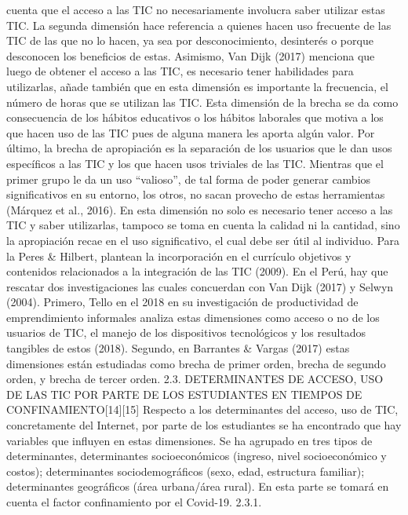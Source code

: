 \begin{enumerate}
  cuenta que el acceso a las TIC no necesariamente involucra saber
  utilizar estas TIC. La segunda dimensión hace referencia a quienes
  hacen uso frecuente de las TIC de las que no lo hacen, ya sea por
  desconocimiento, desinterés o porque desconocen los beneficios de
  estas. Asimismo, Van Dijk (2017) menciona que luego de obtener el
  acceso a las TIC, es necesario tener habilidades para utilizarlas,
  añade también que en esta dimensión es importante la frecuencia, el
  número de horas que se utilizan las TIC. Esta dimensión de la brecha
  se da como consecuencia de los hábitos educativos o los hábitos
  laborales que motiva a los que hacen uso de las TIC pues de alguna
  manera les aporta algún valor. Por último, la brecha de apropiación es
  la separación de los usuarios que le dan usos específicos a las TIC y
  los que hacen usos triviales de las TIC. Mientras que el primer grupo
  le da un uso ``valioso'', de tal forma de poder generar cambios
  significativos en su entorno, los otros, no sacan provecho de estas
  herramientas (Márquez et al., 2016). En esta dimensión no solo es
  necesario tener acceso a las TIC y saber utilizarlas, tampoco se toma
  en cuenta la calidad ni la cantidad, sino la apropiación recae en el
  uso significativo, el cual debe ser útil al individuo. Para la Peres
  \& Hilbert, plantean la incorporación en el currículo objetivos y
  contenidos relacionados a la integración de las TIC (2009). En el
  Perú, hay que rescatar dos investigaciones las cuales concuerdan con
  Van Dijk (2017) y Selwyn (2004). Primero, Tello en el 2018 en su
  investigación de productividad de emprendimiento informales analiza
  estas dimensiones como acceso o no de los usuarios de TIC, el manejo
  de los dispositivos tecnológicos y los resultados tangibles de estos
  (2018). Segundo, en Barrantes \& Vargas (2017) estas dimensiones están
  estudiadas como brecha de primer orden, brecha de segundo orden, y
  brecha de tercer orden. 2.3. DETERMINANTES DE ACCESO, USO DE LAS TIC
  POR PARTE DE LOS ESTUDIANTES EN TIEMPOS DE
  CONFINAMIENTO{[}14{]}{[}15{]} Respecto a los determinantes del acceso,
  uso de TIC, concretamente del Internet, por parte de los estudiantes
  se ha encontrado que hay variables que influyen en estas dimensiones.
  Se ha agrupado en tres tipos de determinantes, determinantes
  socioeconómicos (ingreso, nivel socioeconómico y costos);
  determinantes sociodemográficos (sexo, edad, estructura familiar);
  determinantes geográficos (área urbana/área rural). En esta parte se
  tomará en cuenta el factor confinamiento por el Covid-19. 2.3.1.

\end{enumerate}
